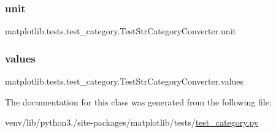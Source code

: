 \subsubsection{\texorpdfstring{unit}{unit}}
{\footnotesize\ttfamily matplotlib.\+tests.\+test\+\_\+category.\+Test\+Str\+Category\+Converter.\+unit}

\mbox{\label{classmatplotlib_1_1tests_1_1test__category_1_1TestStrCategoryConverter_a0345e7e9d36e6251eb52e8831a117fdd}} 
\subsubsection{\texorpdfstring{values}{values}}
{\footnotesize\ttfamily matplotlib.\+tests.\+test\+\_\+category.\+Test\+Str\+Category\+Converter.\+values\hspace{0.3cm}{\ttfamily [static]}}



The documentation for this class was generated from the following file\+:\begin{DoxyCompactItemize}
\item 
venv/lib/python3./site-\/packages/matplotlib/tests/\hyperlink{test__category_8py}{test\+\_\+category.\+py}\end{DoxyCompactItemize}
